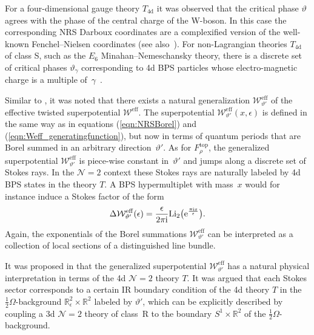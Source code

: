 \documentclass[pdftex]{sigma}
\numberwithin{equation}{section}
\begin{document}
For a four-dimensional gauge theory $T_{\mathrm{4d}}$ it was observed that the critical phase $\vartheta$ agrees with the phase of the central charge of the W-boson. In this case the corresponding NRS Darboux coordinates are a complexified version of the well-known Fenchel--Nielsen coordinates (see also~\cite{Hollands:2013qza}). For non-Lagrangian theories $T_{\mathrm{4d}}$ of class S, such as the $E_{6}$ Minahan--Nemeschansky theory, there is a discrete set of critical phases $\vartheta_{\gamma}$ corresponding to 4d BPS particles whose electro-magnetic charge is a multiple of~$\gamma$~\cite{Hollands:t3abel}.

Similar to \cite{ASTT21}, it was noted that there exists a natural generalization $\mathcal{W}^{\mathrm{eff}}_{\vartheta'}$ of the effective twisted superpotential $\mathcal{W}^{\mathrm{eff}}$. The superpotential $\mathcal{W}^{\mathrm{eff}}_{\vartheta'}(x,\epsilon)$ is defined in the same way as in equations (\ref{eqn:NRSBorel}) and (\ref{eqn:Weff_generatingfunction}), but now in terms of quantum periods that are Borel summed in an arbitrary direction~$\vartheta'$. As for $F^{\mathrm{top}}_{\rho}$, the generalized superpotential $\mathcal{W}^{\mathrm{eff}}_{\vartheta'}$ is piece-wise constant in~$\vartheta'$ and jumps along a discrete set of Stokes rays. In the $\mathcal{N}=2$ context these Stokes rays are naturally labeled by 4d BPS states in the theory $T$. A BPS hypermultiplet with mass~$x$ would for instance induce a Stokes factor of the form
\begin{equation*}%
 \Delta \mathcal{W}^{\mathrm{eff}}_{\vartheta'}(\epsilon) =
 \frac{\epsilon}{2\pi\mathrm{i}} \mathrm{Li}_2\big({\rm e}^{\frac{\pi \mathrm{i} x}{\epsilon}}\big).
\end{equation*}
Again, the exponentials of the Borel summations $\mathcal{W}^{\mathrm{eff}}_{\vartheta'}$ can be interpreted as a collection of local sections of a distinguished line bundle.

It was proposed in \cite{Hollands:t3abel, Hollands:recipe} that the generalized superpotential $\mathcal{W}^{\mathrm{eff}}_{\vartheta'}$ has a natural physical interpretation in terms of the 4d $\mathcal{N}=2$ theory $T$. It was argued that each Stokes sector corresponds to a certain IR boundary condition of the 4d theory $T$ in the $\frac{1}{2}\Omega$-background $\mathbb{R}_\epsilon^{2} \times \mathbb{R}^{2}$ labeled by $\vartheta'$, which can be explicitly described by coupling a 3d $\mathcal{N}=2$ theory of class~R to the boundary $S^{1} \times \mathbb{R}^{2}$ of the $\frac{1}{2}\Omega$-background.
\end{document}
